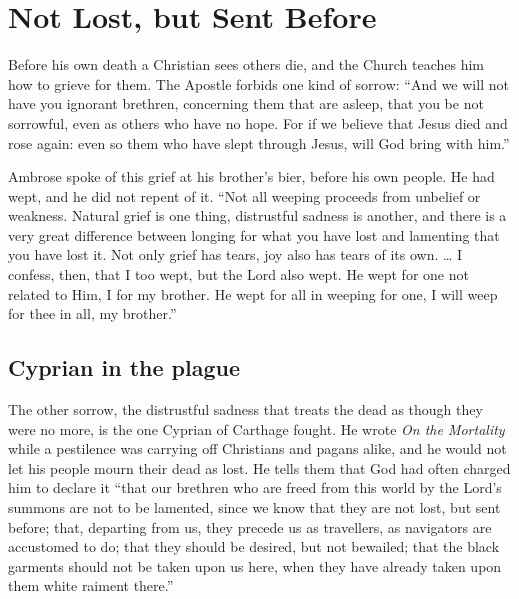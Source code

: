 \section{Not Lost, but Sent Before}

Before his own death a Christian sees others die, and the Church teaches him how to grieve for them. The Apostle forbids one kind of sorrow: ``And we will not have you ignorant brethren, concerning them that are asleep, that you be not sorrowful, even as others who have no hope. For if we believe that Jesus died and rose again: even so them who have slept through Jesus, will God bring with him.''

Ambrose spoke of this grief at his brother's bier, before his own people. He had wept, and he did not repent of it. ``Not all weeping proceeds from unbelief or weakness. Natural grief is one thing, distrustful sadness is another, and there is a very great difference between longing for what you have lost and lamenting that you have lost it. Not only grief has tears, joy also has tears of its own. \ldots{} I confess, then, that I too wept, but the Lord also wept. He wept for one not related to Him, I for my brother. He wept for all in weeping for one, I will weep for thee in all, my brother.''

\subsection{Cyprian in the plague}

The other sorrow, the distrustful sadness that treats the dead as though they were no more, is the one Cyprian of Carthage fought. He wrote \emph{On the Mortality} while a pestilence was carrying off Christians and pagans alike, and he would not let his people mourn their dead as lost. He tells them that God had often charged him to declare it ``that our brethren who are freed from this world by the Lord's summons are not to be lamented, since we know that they are not lost, but sent before; that, departing from us, they precede us as travellers, as navigators are accustomed to do; that they should be desired, but not bewailed; that the black garments should not be taken upon us here, when they have already taken upon them white raiment there.''

